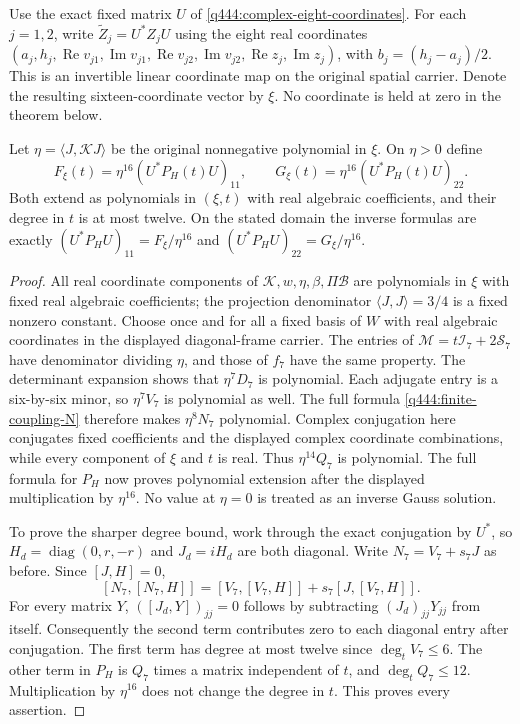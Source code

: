 Use the exact fixed matrix $U$ of
\eqref{q444:complex-eight-coordinates}. For each $j=1,2$, write
$\widetilde Z_j=U^*Z_jU$ using the eight real coordinates
$(a_j,h_j,\operatorname{Re}v_{j1},\operatorname{Im}v_{j1},
\operatorname{Re}v_{j2},\operatorname{Im}v_{j2},
\operatorname{Re}z_j,\operatorname{Im}z_j)$, with $b_j=(h_j-a_j)/2$.
This is an invertible linear coordinate map on the original spatial
carrier. Denote the resulting sixteen-coordinate vector by $\xi$.
No coordinate is held at zero in the theorem below.

\begin{lemma}
\label{q444:generic-polynomial-diagonals}
Let $\eta=\langle J,\mathcal KJ\rangle$ be the original nonnegative
polynomial in $\xi$. On $\eta>0$ define
\[
 F_\xi(t)=\eta^{16}(U^*P_H(t)U)_{11},\qquad
 G_\xi(t)=\eta^{16}(U^*P_H(t)U)_{22}.
\]
Both extend as polynomials in $(\xi,t)$ with real algebraic
coefficients, and their degree in $t$ is at most twelve.
On the stated domain the inverse formulas are exactly
$(U^*P_HU)_{11}=F_\xi/\eta^{16}$ and
$(U^*P_HU)_{22}=G_\xi/\eta^{16}$.
\end{lemma}
\begin{proof}
All real coordinate components of $\mathcal K,w,\eta,\beta,\Pi\mathscr B$
are polynomials in $\xi$ with fixed real algebraic coefficients; the
projection denominator $\langle J,J\rangle=3/4$ is a fixed nonzero
constant. Choose once and for all a fixed basis of $W$ with real
algebraic coordinates in the displayed diagonal-frame carrier.
The entries of $\mathscr M=t\mathcal I_7+2\mathcal S_7$ have
denominator dividing $\eta$, and those of $f_7$ have the same property.
The determinant expansion shows that $\eta^7D_7$ is polynomial.
Each adjugate entry is a six-by-six minor, so $\eta^7V_7$ is
polynomial as well. The full formula
\eqref{q444:finite-coupling-N} therefore makes $\eta^8N_7$
polynomial. Complex conjugation here conjugates fixed coefficients and
the displayed complex coordinate combinations, while every component of
$\xi$ and $t$ is real. Thus $\eta^{14}Q_7$ is polynomial.
The full formula for $P_H$ now proves polynomial extension after the
displayed multiplication by $\eta^{16}$. No value at $\eta=0$
is treated as an inverse Gauss solution.

To prove the sharper degree bound, work through the exact conjugation
by $U^*$, so $H_d=\operatorname{diag}(0,r,-r)$ and
$J_d=iH_d$ are both diagonal. Write $N_7=V_7+s_7J$ as before.
Since $[J,H]=0$,
\[
 [N_7,[N_7,H]]=[V_7,[V_7,H]]+s_7[J,[V_7,H]].
\]
For every matrix $Y$, $([J_d,Y])_{jj}=0$ follows by subtracting
$(J_d)_{jj}Y_{jj}$ from itself. Consequently the second term contributes
zero to each diagonal entry after conjugation. The first term has
degree at most twelve since $\deg_t V_7\le6$. The other term in
$P_H$ is $Q_7$ times a matrix independent of $t$, and
$\deg_t Q_7\le12$. Multiplication by $\eta^{16}$ does not
change the degree in $t$. This proves every assertion.
\end{proof}

